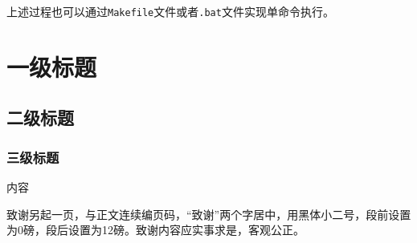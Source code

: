 \documentclass{ecustbachelorthesis}
\begin{document}
上述过程也可以通过\verb$Makefile$文件或者\verb$.bat$文件实现单命令执行。
\section{一级标题}
\subsection{二级标题}
\subsubsection{三级标题}
内容

\acknowledgement
致谢另起一页，与正文连续编页码，“致谢”两个字居中，用黑体小二号，段前设置为0磅，段后设置为12磅。致谢内容应实事求是，客观公正。\cite{ecustack}
\end{document}
